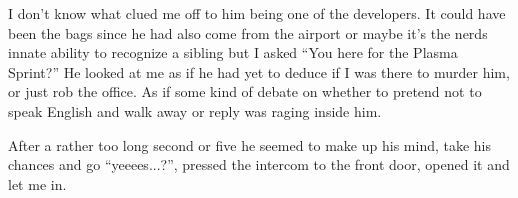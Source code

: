 I don't know what clued me off to him being one of the developers. It could have been the bags since he had also come from the airport or maybe it's the nerds innate ability to recognize a sibling but I asked “You here for the Plasma Sprint?” 
He looked at me as if he had yet to deduce if I was there to murder him, or just rob the office. As if some kind of debate on whether to pretend not to speak English and walk away or reply was raging inside him. 

After a rather too long second or five he seemed to make up his mind, take his chances and go “yeeees...?”, pressed the intercom to the front door, opened it and let me in.

